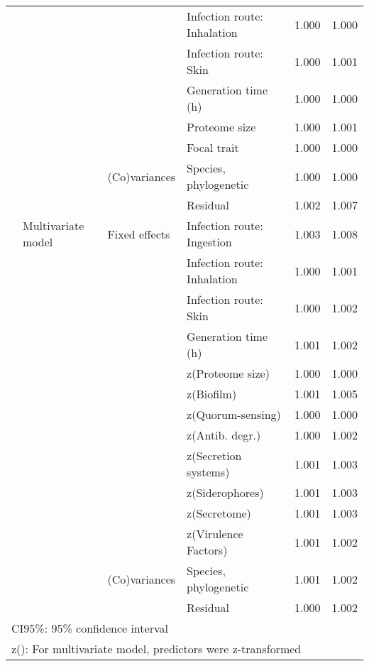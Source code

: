 \begin{longtable}[t]{llllll}
\hspace{1em} &  &  & Infection route: Inhalation & 1.000 & 1.000\\
\hspace{1em} &  &  & Infection route: Skin & 1.000 & 1.001\\
\hspace{1em} &  &  & Generation time (h) & 1.000 & 1.000\\
\hspace{1em} &  &  & Proteome size & 1.000 & 1.001\\
\hspace{1em} &  &  & Focal trait & 1.000 & 1.000\\
\hspace{1em} &  & (Co)variances & Species, phylogenetic & 1.000 & 1.000\\
\hspace{1em} &  &  & Residual & 1.002 & 1.007\\
\hspace{1em} & Multivariate model & Fixed effects & Infection route: Ingestion & 1.003 & 1.008\\
\hspace{1em} &  &  & Infection route: Inhalation & 1.000 & 1.001\\
\hspace{1em} &  &  & Infection route: Skin & 1.000 & 1.002\\
\hspace{1em} &  &  & Generation time (h) & 1.001 & 1.002\\
\hspace{1em} &  &  & z(Proteome size) & 1.000 & 1.000\\
\hspace{1em} &  &  & z(Biofilm) & 1.001 & 1.005\\
\hspace{1em} &  &  & z(Quorum-sensing) & 1.000 & 1.000\\
\hspace{1em} &  &  & z(Antib. degr.) & 1.000 & 1.002\\
\hspace{1em} &  &  & z(Secretion systems) & 1.001 & 1.003\\
\hspace{1em} &  &  & z(Siderophores) & 1.001 & 1.003\\
\hspace{1em} &  &  & z(Secretome) & 1.001 & 1.003\\
\hspace{1em} &  &  & z(Virulence Factors) & 1.001 & 1.002\\
\hspace{1em} &  & (Co)variances & Species, phylogenetic & 1.001 & 1.002\\
\hspace{1em} &  &  & Residual & 1.000 & 1.002\\*
\multicolumn{6}{l}{\rule{0pt}{1em}CI95\%: 95\% confidence interval}\\
\multicolumn{6}{l}{\rule{0pt}{1em}z(): For multivariate model, predictors were z-transformed}\\
\end{longtable}
